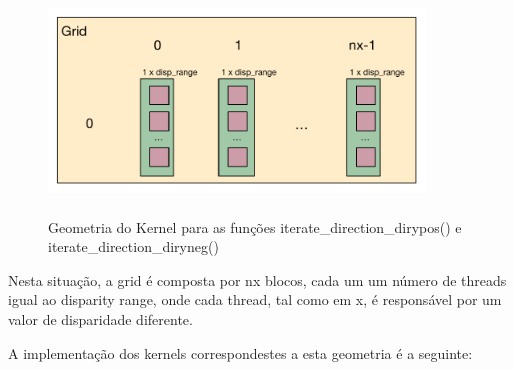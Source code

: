\documentclass[pdftex,12pt,a4paper]{report}
\begin{document}
\begin{figure}[!htb]
\center
 \includegraphics[width=100mm,scale=1]{IteratePositionDiryposneg_v2_kernel.pdf}
 \caption{\\ Geometria do Kernel para as funções iterate\_direction\_dirypos() e iterate\_direction\_diryneg()}
 \label{fig:IteratePositionDiryposneg_v2_kernel}
\end{figure}

Nesta situação, a grid é composta por nx blocos, cada um um número de threads igual ao disparity range, onde cada thread, tal como em x, é responsável por um valor de disparidade diferente.

A implementação dos kernels correspondestes a esta geometria é a seguinte:
\end{document}
